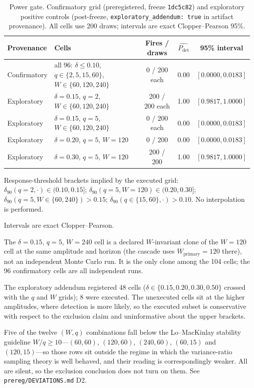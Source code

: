 \documentclass[3p]{elsarticle}
\newcommand{\Pdet}{\ensuremath{P_{\mathrm{det}}}}
\begin{document}
\begin{table}[htbp]
\centering
\begin{threeparttable}
\caption{Power gate. Confirmatory grid (preregistered, freeze
\texttt{1dc5c82}) and exploratory positive controls (post-freeze,
\texttt{exploratory\_addendum: true} in artifact provenance). All cells use
200 draws; intervals are exact Clopper--Pearson 95\%.}
\label{tab:power}
\small
\begin{tabular}{l l c c c}
\toprule
Provenance & Cells & Fires / draws & $\widehat{\Pdet}$ & 95\% interval \\
\midrule
Confirmatory & all 96: $\delta\le 0.10$, $q\in\{2,5,15,60\}$, $W\in\{60,120,240\}$ & 0 / 200 each & 0.00 & $[0.0000, 0.0183]$ \\
\midrule
Exploratory & $\delta=0.15$, $q=2$, $W\in\{60,120,240\}$ & 200 / 200 each & 1.00 & $[0.9817, 1.0000]$ \\
Exploratory & $\delta=0.15$, $q=5$, $W\in\{60,120,240\}$ & 0 / 200 each & 0.00 & $[0.0000, 0.0183]$ \\
Exploratory & $\delta=0.20$, $q=5$, $W=120$ & 0 / 200 & 0.00 & $[0.0000, 0.0183]$ \\
Exploratory & $\delta=0.30$, $q=5$, $W=120$ & 200 / 200 & 1.00 & $[0.9817, 1.0000]$ \\
\bottomrule
\end{tabular}
\begin{tablenotes}\footnotesize
\item Response-threshold brackets implied by the executed grid:
$\delta_{90}(q{=}2,\cdot)\in(0.10,0.15]$;
$\delta_{90}(q{=}5,W{=}120)\in(0.20,0.30]$;
$\delta_{90}(q{=}5,W\in\{60,240\})>0.15$;
$\delta_{90}(q\in\{15,60\},\cdot)>0.10$. No interpolation is performed.
\item Intervals are exact Clopper--Pearson.
\item The $\delta=0.15$, $q{=}5$, $W{=}240$ cell is a declared
$W$-invariant clone of the $W{=}120$ cell at the same amplitude and horizon
(the cascade uses $W_{\text{primary}}{=}120$ there), not an independent Monte
Carlo run. It is the only clone among the 104 cells; the 96 confirmatory
cells are all independent runs.
\item The exploratory addendum registered 48 cells
($\delta\in\{0.15,0.20,0.30,0.50\}$ crossed with the $q$ and $W$ grids); 8
were executed. The unexecuted cells sit at the higher amplitudes, where
detection is more likely, so the executed subset is conservative with respect
to the exclusion claim and uninformative about the upper brackets.
\item Five of the twelve $(W,q)$ combinations fall below the Lo--MacKinlay
stability guideline $W/q\ge10$---$(60,60)$, $(120,60)$, $(240,60)$, $(60,15)$
and $(120,15)$---so those rows sit outside the regime in which the
variance-ratio sampling theory is well behaved, and their reading is
correspondingly weaker. All are silent, so the exclusion conclusion does not
turn on them. See \texttt{prereg/DEVIATIONS.md} D2.
\end{tablenotes}
\end{threeparttable}
\end{table}
\end{document}
